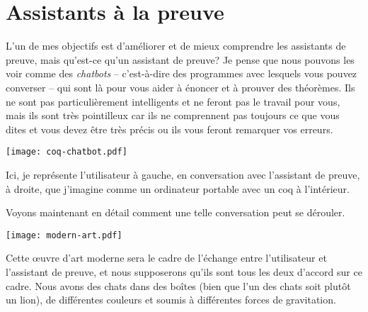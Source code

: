 %
\section{Assistants à la preuve}

L'un de mes objectifs est d'améliorer et de mieux comprendre les assistants de
preuve, mais qu'est-ce qu'un assistant de preuve?
Je pense que nous pouvons les voir comme des \emph{chatbots} -- c'est-à-dire
des programmes avec lesquels vous pouvez converser -- qui sont là pour vous
aider à énoncer et à prouver des théorèmes.
Ils ne sont pas particulièrement intelligents et ne feront pas le travail pour
vous, mais ils sont très pointilleux car ils ne comprennent pas toujours ce que
vous dites et vous devez être très précis ou ils vous feront remarquer vos
erreurs.

%
\begin{center}
  \texttt{[image: coq-chatbot.pdf]}
\end{center}

Ici, je représente l'utilisateur à gauche, en conversation avec l'assistant
de preuve, à droite, que j'imagine comme un ordinateur portable avec un coq à
l'intérieur.

Voyons maintenant en détail comment une telle conversation peut se dérouler.

\begin{center}
  \texttt{[image: modern-art.pdf]}
\end{center}

Cette œuvre d'art moderne sera le cadre de l'échange entre l'utilisateur et
l'assistant de preuve, et nous supposerons qu'ils sont tous les deux d'accord
sur ce cadre.
Nous avons des chats dans des boîtes (bien que l'un des chats soit plutôt un
lion), de différentes couleurs et soumis à différentes forces de gravitation.

